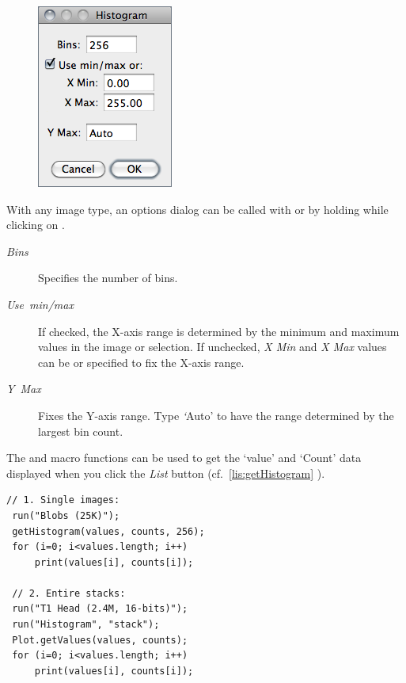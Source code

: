 \begin{figure}%
\includegraphics[scale=0.55]{images/HistogramDialog}\end{figure}%
With any image type, an options dialog can be called with 
 or by holding  while clicking on
.
\begin{description}
\item [{\emph{Bins}}] Specifies the number of bins.
\item [{\emph{Use\ min/max}}] If checked, the X-axis range is determined
by the minimum and maximum values in the image or selection. If unchecked,
\emph{X Min} and\emph{ X Max} values can be or specified to fix the
X-axis range. 
\item [{\emph{Y\ Max}}] Fixes the Y-axis range. Type \emph{`}Auto' to
have the range determined by the largest bin count.
\end{description}
The  and  macro functions
can be used to get the `value' and `Count' data displayed when
you click the \emph{List} button (cf.\ \eqref{lis:getHistogram}
).

\begin{lstlisting}[caption={[Obtaining Histogram Lists]Obtaining Histogram Lists},label={lis:getHistogram},showstringspaces=false,tabsize=4]
 // 1. Single images: 
 run("Blobs (25K)"); 
 getHistogram(values, counts, 256); 
 for (i=0; i<values.length; i++)
     print(values[i], counts[i]);

 // 2. Entire stacks:
 run("T1 Head (2.4M, 16-bits)");
 run("Histogram", "stack");
 Plot.getValues(values, counts);
 for (i=0; i<values.length; i++)
     print(values[i], counts[i]);
\end{lstlisting}



\subsection[{\protect\userinterface{Plot Profile {[}k{]}}}]{\protect{}\label{sub:Plot-Profile-[k]}}


